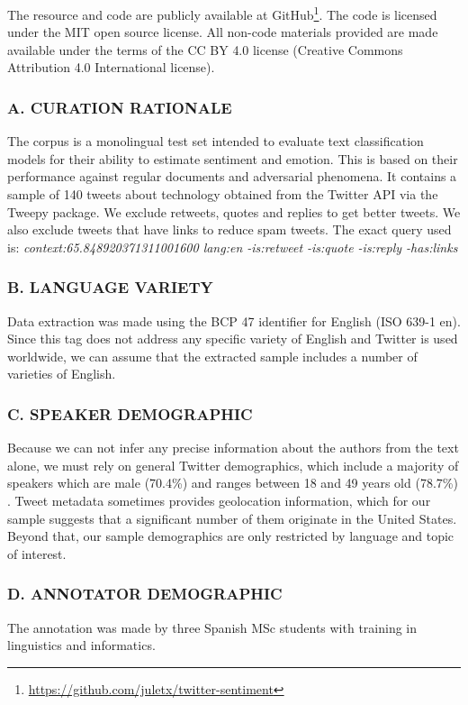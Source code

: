 \documentclass[11pt,a4paper]{article}
\begin{document}
\cite{bender-friedman-2018-data}

The resource and code are publicly available at GitHub\footnote{\url{https://github.com/juletx/twitter-sentiment}}. The code is licensed under the MIT open source license. All non-code materials provided are made available under the terms of the CC BY 4.0 license
(Creative Commons Attribution 4.0 International license).

\subsubsection*{A. CURATION RATIONALE}
The corpus is a monolingual test set intended to evaluate text classification models for their ability to estimate sentiment and emotion. This is based on their performance against regular documents and adversarial phenomena. It contains a sample of 140 tweets about technology obtained from the Twitter API via the Tweepy package. We exclude retweets, quotes and replies to get better tweets. We also exclude tweets that have links to reduce spam tweets. The exact query used is:  \textit{context:65.848920371311001600 lang:en -is:retweet -is:quote -is:reply -has:links}

\subsubsection*{B. LANGUAGE VARIETY}
Data extraction was made using the BCP 47 identifier for English (ISO 639-1 en). Since this tag does not address any specific variety of English and Twitter is used worldwide, we can assume that the extracted sample includes a number of varieties of English.

\subsubsection*{C. SPEAKER DEMOGRAPHIC}
Because we can not infer any precise information about the authors from the text alone, we must rely on general Twitter demographics, which include a majority of speakers which are male (70.4\%) and ranges between 18 and 49 years old (78.7\%) . Tweet metadata sometimes provides geolocation information, which for our sample suggests that a significant number of them originate in the United States. Beyond that, our sample demographics are only restricted by language and topic of interest.

\subsubsection*{D. ANNOTATOR DEMOGRAPHIC}
The annotation was made by three Spanish MSc students with training in linguistics and informatics.
\end{document}
